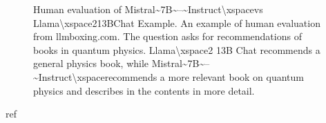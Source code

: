 \documentclass[11pt,a4paper]{article}
\begin{document}
\begin{figure}[h]
\caption{Human evaluation of Mistral\textasciitilde{}7B\textasciitilde{}--\textasciitilde{}Instruct\textbackslash{}xspacevs Llama\textbackslash{}xspace213BChat Example. An example of human evaluation from llmboxing.com. The question asks for recommendations of books in quantum physics. Llama\textbackslash{}xspace2 13B  Chat recommends a general physics book, while Mistral\textasciitilde{}7B\textasciitilde{}--\textasciitilde{}Instruct\textbackslash{}xspacerecommends a more relevant book on quantum physics and describes in the contents in more detail.}
\end{figure}

ref
\end{document}
